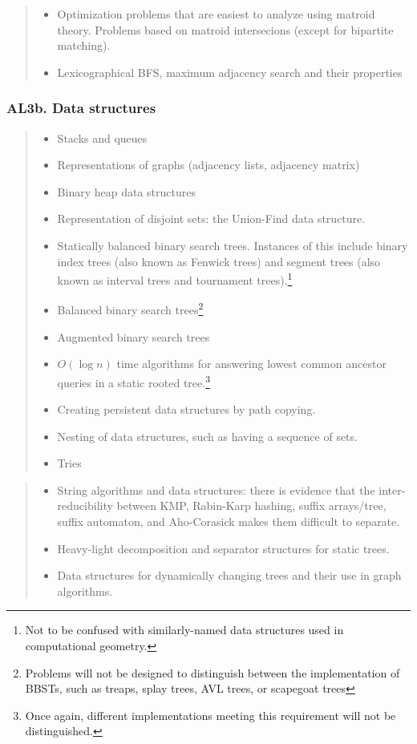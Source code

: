 \documentclass[a4paper,11pt,oneside]{article}
\newcommand{\cmark}{\ding{51}}%
\newcommand{\xmark}{\ding{55}}%
\newcommand{\CC}[1]{#1}
\newcommand{\cdef}{{\small\cmark\faFileTextO}}
\newcommand{\ccode}{{\small\cmark\faFileText}}
\newcommand{\cemay}{{\small\xmark\faQuestionCircle}}
\newcommand{\cexcl}{{\small\xmark}}
\newcommand{\Idefine}{\item[\hbox to 1.8em{\cdef\hfill}]}
\newcommand{\Icodeonly}{\item[\hbox to 1.8em{\ccode\hfill}]}
\newcommand{\Iexmaybe}{\item[\hbox to 1.8em{\cemay\hfill}]}
\newcommand{\Iexcluded}{\item[\hbox to 1.8em{\cexcl\hfill}]}
\newenvironment{myitemize}{\begin{quote}\begin{itemize}\itemsep 0pt}{\end{itemize}\end{quote}}
\begin{document}
    \begin{myitemize}
    \Iexcluded Optimization problems that are easiest to analyze using matroid theory. Problems based on matroid intersecions (except for bipartite matching).
    \Iexcluded Lexicographical BFS, maximum adjacency search and their properties
    \end{myitemize}
 
    \subsubsection*{AL3b. Data structures}%
  
    \begin{myitemize}
    \Idefine Stacks and queues
    \Icodeonly \CC{Representations of graphs (adjacency lists, adjacency matrix)}
    \Idefine Binary heap data structures
    \Icodeonly Representation of disjoint sets: the Union-Find data structure.
    \Idefine Statically balanced binary search trees. Instances of this include binary index trees (also known as Fenwick trees)
    and segment trees (also known as interval trees and tournament trees).\footnote{Not to be confused with similarly-named data structures used in computational geometry.}
    \Icodeonly {Balanced binary search trees}\footnote{Problems will not be designed to distinguish between
    the implementation of BBSTs, such as treaps, splay trees, AVL trees, or scapegoat trees}
    \Idefine Augmented binary search trees
    \Icodeonly $O(\log n)$ time algorithms for answering lowest common ancestor queries in a static rooted tree.\footnote{Once again, different implementations meeting this requirement will not be distinguished.}
    \Icodeonly Creating persistent data structures by path copying.%
    \Icodeonly Nesting of data structures, such as having a sequence of sets.
    \Idefine Tries
    \end{myitemize}

    \begin{myitemize}
    \Iexmaybe String algorithms and data structures: there is evidence that the inter-reducibility between KMP, Rabin-Karp hashing, suffix arrays/tree, suffix automaton, and Aho-Corasick makes them difficult to separate.
    \Iexmaybe Heavy-light decomposition and separator structures for static trees.
    \Iexmaybe Data structures for dynamically changing trees and their use in graph algorithms.
    \end{myitemize}
\end{document}
